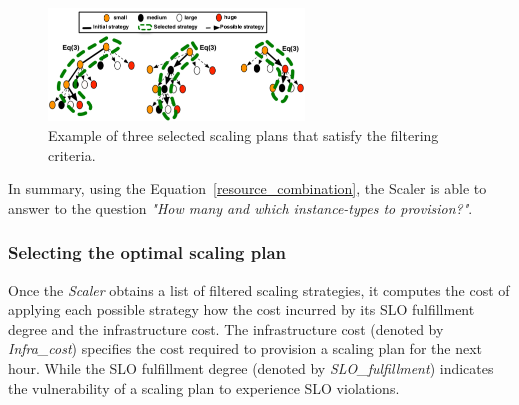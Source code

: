 \begin{figure}[t]
  \begin{center}
    \includegraphics[width=0.7\linewidth,height=3cm]{images/optimalTree_selection}
  \end{center}
\vspace{-3mm}
  \caption{Example of three selected scaling plans that satisfy the filtering criteria.}
  \label{fig:scalingTreeSelection}
\end{figure}



In summary, using the Equation~\ref{resource_combination}, the Scaler is able to answer to the question \emph{"How many and which instance-types to provision?"}.


\subsubsection{Selecting the optimal scaling plan}



Once the \emph{Scaler} obtains a list of filtered scaling strategies, it computes the cost of applying each possible strategy how the cost incurred by its SLO fulfillment degree and the infrastructure cost. The infrastructure cost (denoted by \emph{Infra\_cost}) specifies the cost required to provision a scaling plan for the next hour. While the SLO fulfillment degree (denoted by \emph{SLO\_fulfillment}) indicates the vulnerability of a scaling plan to experience SLO violations. 

